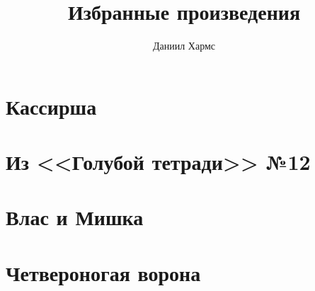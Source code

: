 \documentclass[12pt]{article}
\title{Избранные произведения}
\author{Даниил Хармс}
\date{}
\begin{document}
\maketitle

\section{Кассирша}


\section{Из <<Голубой тетради>> №12}


\section{Влас и Мишка}


\section{Четвероногая ворона}

\end{document}
